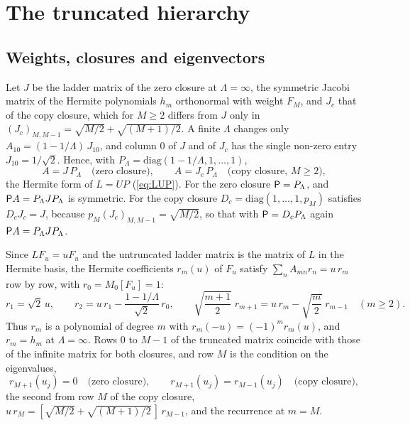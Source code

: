 \section{The truncated hierarchy}\label{app:truncated}

\subsection{Weights, closures and eigenvectors}

Let $J$ be the ladder matrix of the zero closure at $\Lambda=\infty$, the symmetric Jacobi matrix of the Hermite polynomials $h_m$ orthonormal with weight $F_M$, and $J_c$ that of the copy closure, which for $M\ge2$ differs from $J$ only in $(J_c)_{M,M-1}=\sqrt{M/2}+\sqrt{(M+1)/2}$. A finite $\Lambda$ changes only $A_{10}=(1-1/\Lambda)\,J_{10}$, and column $0$ of $J$ and of $J_c$ has the single non-zero entry $J_{10}=1/\sqrt2$. Hence, with $P_\Lambda=\mathrm{diag}(1-1/\Lambda,1,\dots,1)$,
\begin{equation}\label{appC:factor}
  A=J\,P_\Lambda\quad\text{(zero closure)},\qquad A=J_c\,P_\Lambda\quad\text{(copy closure, $M\ge2$)},
\end{equation}
the Hermite form of $L=UP$ (\ref{eq:LUP}). For the zero closure $\mathsf P=P_\Lambda$, and $\mathsf P A=P_\Lambda JP_\Lambda$ is symmetric. For the copy closure $D_c=\mathrm{diag}(1,\dots,1,p_M)$ satisfies $D_cJ_c=J$, because $p_M(J_c)_{M,M-1}=\sqrt{M/2}$, so that with $\mathsf P=D_cP_\Lambda$ again $\mathsf P A=P_\Lambda JP_\Lambda$.

Since $LF_u=uF_u$ and the untruncated ladder matrix is the matrix of $L$ in the Hermite basis, the Hermite coefficients $r_m(u)$ of $F_u$ satisfy $\sum_nA_{mn}r_n=u\,r_m$ row by row, with $r_0=M_0[F_u]=1$:
\begin{equation}\label{appC:rec}
  r_1=\sqrt2\,u,\qquad r_2=u\,r_1-\frac{1-1/\Lambda}{\sqrt2}\,r_0,\qquad
  \sqrt{\frac{m+1}{2}}\;r_{m+1}=u\,r_m-\sqrt{\frac m2}\;r_{m-1}\quad(m\ge2).
\end{equation}
Thus $r_m$ is a polynomial of degree $m$ with $r_m(-u)=(-1)^mr_m(u)$, and $r_m=h_m$ at $\Lambda=\infty$. Rows $0$ to $M-1$ of the truncated matrix coincide with those of the infinite matrix for both closures, and row $M$ is the condition on the eigenvalues,
\begin{equation}\label{appC:eigcond}
  r_{M+1}(u_j)=0\quad\text{(zero closure)},\qquad r_{M+1}(u_j)=r_{M-1}(u_j)\quad\text{(copy closure)},
\end{equation}
the second from row $M$ of the copy closure, $u\,r_M=[\sqrt{M/2}+\sqrt{(M+1)/2}\,]\,r_{M-1}$, and the recurrence at $m=M$.

